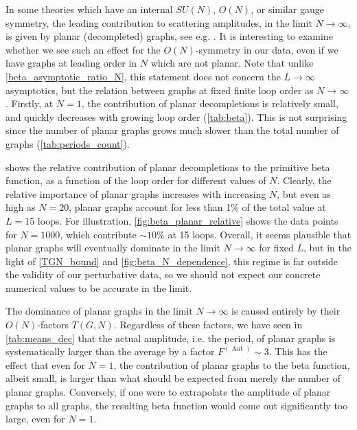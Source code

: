 \documentclass[11pt,a4paper]{article}
\newcommand{\Aut}{\operatorname{Aut}}
\renewcommand{\|}{\rule[-0.4ex]{0.2ex}{1.2em}}
\begin{document}
In some theories which have an internal $SU(N)$, $O(N)$, or similar gauge symmetry,  the leading contribution to   scattering amplitudes,  in the limit $N\rightarrow\infty$, is given by  planar (decompleted) graphs, see e.g. \cite{hooft_planar_1974,gurau_colored_2012}. It is interesting to examine whether we see such an effect for the $O(N)$-symmetry in our data, even if we have graphs at leading order in $N$ which are not planar. Note that unlike \cref{beta_asymptotic_ratio_N}, this statement does not concern the $L\rightarrow\infty$ asymptotics, but the relation between graphs at fixed finite loop order as $N\rightarrow \infty$.
Firstly, at $N=1$, the contribution of planar decompletions is relatively small, and quickly decreases with growing loop order (\cref{tab:beta}).  This is not surprising since the number of planar graphs grows much slower than the total number of graphs (\cref{tab:periods_count}). 

 shows the relative contribution of planar decompletions to the primitive beta function, as a function of the loop order for different values of $N$. Clearly, the relative importance of planar graphs increases with increasing $N$, but even as high as $N=20$, planar graphs account for less than 1\% of the total value at $L=15$ loops.   For illustration, \cref{fig:beta_planar_relative} shows the data points for $N=1000$, which contribute $\sim 10\%$ at 15 loops.   Overall, it seems plausible that planar graphs will eventually dominate in the limit $N\rightarrow \infty$ for fixed $L$, but in the light of \cref{TGN_bound} and \cref{fig:beta_N_dependence}, this regime is far outside the validity of our perturbative data, so we should not expect our concrete numerical values to be accurate in the limit.







The dominance of planar graphs in the limit $N\rightarrow\infty$ is caused entirely by their $O(N)$-factors $T(G,N)$. Regardless of these factors, we have seen in \cref{tab:means_dec} that the actual amplitude, i.e. the period, of planar graphs is systematically larger than the average by a factor $F^{(\Aut)}\sim 3$. This has the effect that even for $N=1$, the contribution of planar graphs to the beta function, albeit small, is larger than what should be expected from merely the number of planar graphs. Conversely, if one were to extrapolate the amplitude of planar graphs to all graphs, the resulting beta function would come out significantly too large, even for $N=1$.
\end{document}
